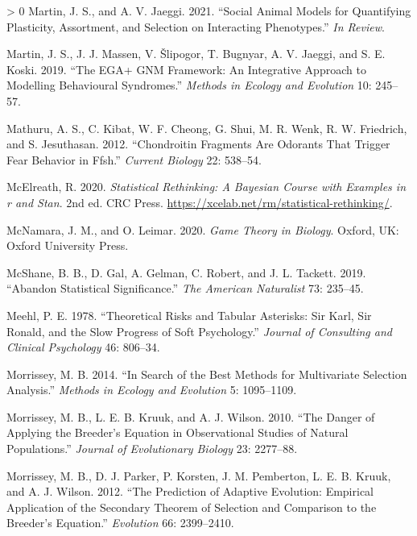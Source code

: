 \documentclass{article}
\newlength{\cslhangindent}
\newenvironment{CSLReferences}[3] %
 {%
  \setlength{\parindent}{0pt}
  \ifodd #1 \everypar{\setlength{\hangindent}{\cslhangindent}}\ignorespaces\fi
  \ifnum #2 > 0
  \setlength{\parskip}{#2\baselineskip}
  \fi
 }%
 {}
\begin{document}
\begin{CSLReferences}{1}{0}
\leavevmode\hypertarget{ref-Martin2021}{}%
Martin, J. S., and A. V. Jaeggi. 2021. {``Social Animal Models for
Quantifying Plasticity, Assortment, and Selection on Interacting
Phenotypes.''} \emph{In Review}.

\leavevmode\hypertarget{ref-Martin2019}{}%
Martin, J. S., J. J. Massen, V. Šlipogor, T. Bugnyar, A. V. Jaeggi, and
S. E. Koski. 2019. {``The EGA+ GNM Framework: An Integrative Approach to
Modelling Behavioural Syndromes.''} \emph{Methods in Ecology and
Evolution} 10: 245--57.

\leavevmode\hypertarget{ref-Mathuru2012}{}%
Mathuru, A. S., C. Kibat, W. F. Cheong, G. Shui, M. R. Wenk, R. W.
Friedrich, and S. Jesuthasan. 2012. {``Chondroitin Fragments Are
Odorants That Trigger Fear Behavior in Ffsh.''} \emph{Current Biology}
22: 538--54.

\leavevmode\hypertarget{ref-Rethinking}{}%
McElreath, R. 2020. \emph{Statistical Rethinking: A Bayesian Course with
Examples in r and Stan}. 2nd ed. CRC Press.
\url{https://xcelab.net/rm/statistical-rethinking/}.

\leavevmode\hypertarget{ref-McNamara2020}{}%
McNamara, J. M., and O. Leimar. 2020. \emph{Game Theory in Biology}.
Oxford, UK: Oxford University Press.

\leavevmode\hypertarget{ref-McShane2019}{}%
McShane, B. B., D. Gal, A. Gelman, C. Robert, and J. L. Tackett. 2019.
{``Abandon Statistical Significance.''} \emph{The American Naturalist}
73: 235--45.

\leavevmode\hypertarget{ref-Meehl1978}{}%
Meehl, P. E. 1978. {``Theoretical Risks and Tabular Asterisks: Sir Karl,
Sir Ronald, and the Slow Progress of Soft Psychology.''} \emph{Journal
of Consulting and Clinical Psychology} 46: 806--34.

\leavevmode\hypertarget{ref-Morrissey2014}{}%
Morrissey, M. B. 2014. {``In Search of the Best Methods for Multivariate
Selection Analysis.''} \emph{Methods in Ecology and Evolution} 5:
1095--1109.

\leavevmode\hypertarget{ref-Morrissey2010}{}%
Morrissey, M. B., L. E. B. Kruuk, and A. J. Wilson. 2010. {``The Danger
of Applying the Breeder's Equation in Observational Studies of Natural
Populations.''} \emph{Journal of Evolutionary Biology} 23: 2277--88.

\leavevmode\hypertarget{ref-Morrissey2012}{}%
Morrissey, M. B., D. J. Parker, P. Korsten, J. M. Pemberton, L. E. B.
Kruuk, and A. J. Wilson. 2012. {``The Prediction of Adaptive Evolution:
Empirical Application of the Secondary Theorem of Selection and
Comparison to the Breeder's Equation.''} \emph{Evolution} 66:
2399--2410.


\end{CSLReferences}
\end{document}
